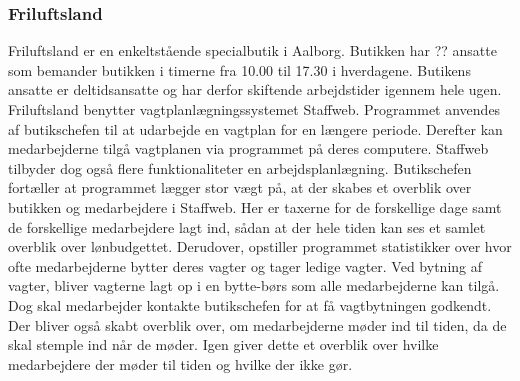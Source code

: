 \subsubsection{Friluftsland}
Friluftsland er en enkeltstående specialbutik i Aalborg. Butikken har ?? ansatte som bemander butikken i timerne fra 10.00 til 17.30 i hverdagene. Butikens ansatte er deltidsansatte og har derfor skiftende arbejdstider igennem hele ugen. Friluftsland benytter vagtplanlægningssystemet Staffweb. Programmet anvendes af butikschefen til at udarbejde en vagtplan for en længere periode. Derefter kan medarbejderne tilgå vagtplanen via programmet på deres computere. Staffweb tilbyder dog også flere funktionaliteter en arbejdsplanlægning. Butikschefen fortæller at programmet lægger stor vægt på, at der skabes et overblik over butikken og medarbejdere i Staffweb. Her er taxerne for de forskellige dage samt de forskellige medarbejdere lagt ind, sådan at der hele tiden kan ses et samlet overblik over lønbudgettet. Derudover, opstiller programmet statistikker over hvor ofte medarbejderne bytter deres vagter og tager ledige vagter. Ved bytning af vagter, bliver vagterne lagt op i en bytte-børs som alle medarbejderne kan tilgå. Dog skal medarbejder kontakte butikschefen for at få vagtbytningen godkendt. Der bliver også skabt overblik over, om medarbejderne møder ind til tiden, da de skal stemple ind når de møder. Igen giver dette et overblik over hvilke medarbejdere der møder til tiden og hvilke der ikke gør.

